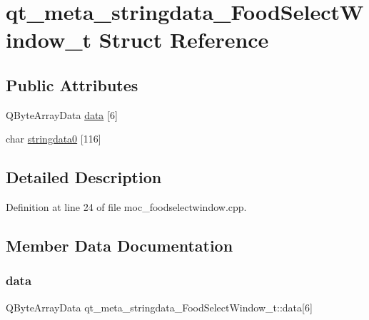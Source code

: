 \hypertarget{structqt__meta__stringdata___food_select_window__t}{}\section{qt\+\_\+meta\+\_\+stringdata\+\_\+\+Food\+Select\+Window\+\_\+t Struct Reference}
\label{structqt__meta__stringdata___food_select_window__t}
\subsection*{Public Attributes}
\begin{DoxyCompactItemize}
\item 
Q\+Byte\+Array\+Data \mbox{\hyperlink{structqt__meta__stringdata___food_select_window__t_a49ed28538e8ca4a571442215349ce9ba}{data}} \mbox{[}6\mbox{]}
\item 
char \mbox{\hyperlink{structqt__meta__stringdata___food_select_window__t_a9169177486e14663a4195d726847e397}{stringdata0}} \mbox{[}116\mbox{]}
\end{DoxyCompactItemize}


\subsection{Detailed Description}


Definition at line 24 of file moc\+\_\+foodselectwindow.\+cpp.



\subsection{Member Data Documentation}
\mbox{\label{structqt__meta__stringdata___food_select_window__t_a49ed28538e8ca4a571442215349ce9ba}} 
\subsubsection{\texorpdfstring{data}{data}}
{\footnotesize\ttfamily Q\+Byte\+Array\+Data qt\+\_\+meta\+\_\+stringdata\+\_\+\+Food\+Select\+Window\+\_\+t\+::data\mbox{[}6\mbox{]}}



